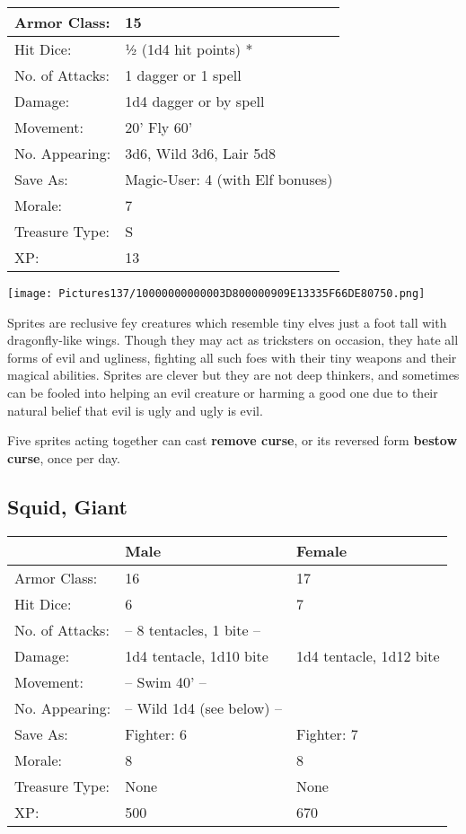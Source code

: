 \documentclass[a4paper,twoside,openany,10pt]{book}
\begin{document}
\begin{multicols}{2}
\begin{tabularx}{0.50\textwidth}{@{}lX@{}}
Armor Class: & 15 \\\hline
Hit Dice: & ½ (1d4 hit points) * \\\hline
No. of Attacks: & 1 dagger or 1 spell \\\hline
Damage: & 1d4 dagger or by spell \\\hline
Movement: & 20' Fly 60' \\\hline
No. Appearing: & 3d6, Wild 3d6, Lair 5d8 \\\hline
Save As: & Magic-User: 4 (with Elf bonuses) \\\hline
Morale: & 7 \\\hline
Treasure Type: & S \\\hline
XP: & 13 \\\hline
\end{tabularx}\medskip

\begin{center}
\texttt{[image: Pictures137/10000000000003D800000909E13335F66DE80750.png]}
\end{center}

Sprites are reclusive fey creatures which resemble tiny elves just a foot tall with dragonfly-like wings. Though they may act as tricksters on occasion, they hate all forms of evil and ugliness, fighting all such foes with their tiny weapons and their magical abilities. Sprites are clever but they are not deep thinkers, and sometimes can be fooled into helping an evil creature or harming a good one due to their natural belief that evil is ugly and ugly is evil. 

Five sprites acting together can cast \textbf{remove curse}, or its reversed form \textbf{bestow curse}, once per day.

\subsection*{Squid, Giant}\label{squid-giant}

\begin{tabularx}{0.50\textwidth}{@{}lXX@{}}
& Male & Female \\\hline
Armor Class: & 16 & 17 \\\hline
Hit Dice: & 6 & 7 \\\hline
No. of Attacks: & -- 8 tentacles, 1 bite -- & \\\hline
Damage: & 1d4 tentacle, 1d10 bite & 1d4 tentacle, 1d12 bite \\\hline
Movement: & -- Swim 40' -- & \\\hline
No. Appearing: & -- Wild 1d4 (see below) -- & \\\hline
Save As: & Fighter: 6 & Fighter: 7 \\\hline
Morale: & 8 & 8 \\\hline
Treasure Type: & None & None \\\hline
XP: & 500 & 670 \\\hline
\end{tabularx}\medskip


\end{multicols}
\end{document}
